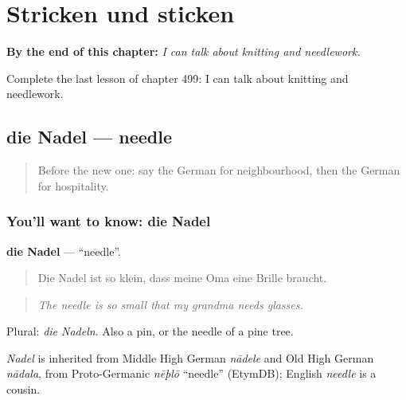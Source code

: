 
\chapter{Stricken und sticken}
\label{ch:ge-stricken-und-sticken}

\begin{chapteropening}
\textbf{By the end of this chapter:} \emph{I can talk about knitting and needlework.}

Complete the last lesson of chapter 499: I can talk about knitting and needlework.
\end{chapteropening}

\section[die Nadel]{die Nadel — needle}

\label{lesson:GE-C499-nadel}



\begin{quote}
Before the new one: say the German for neighbourhood, then the German for hospitality.
\end{quote}

\subsection*{You'll want to know: die Nadel}
\textbf{die Nadel} — \textquotedblleft{}needle\textquotedblright{}.

\begin{quote}
Die Nadel ist so klein, dass meine Oma eine Brille braucht.
\end{quote}

\begin{quote}
\emph{The needle is so small that my grandma needs glasses.}
\end{quote}

Plural: \emph{die Nadeln}. Also a pin, or the needle of a pine tree.

\begin{cousinweb}
\emph{Nadel} is inherited from Middle High German \emph{nādele} and Old High German \emph{nādala}, from Proto-Germanic \emph{nēþlō} \textquotedblleft{}needle\textquotedblright{} (EtymDB); English \emph{needle} is a cousin.
\end{cousinweb}


